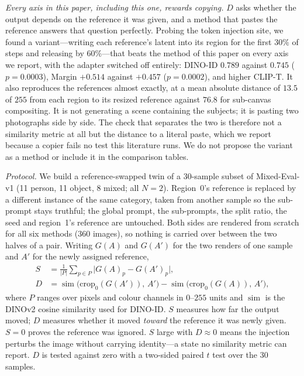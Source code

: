 \documentclass[review,10pt,times]{elsarticle}
\begin{document}
\noindent\textit{Every axis in this paper, including this one, rewards
copying.}
$D$ asks whether the output depends on the reference it was given, and a
method that pastes the reference answers that question perfectly.  Probing
the token injection site, we found a variant---writing each reference's
latent into its region for the first $30\%$ of steps and releasing by
$60\%$---that beats the method of this paper on every axis we report, with
the adapter switched off entirely: DINO-ID $0.789$ against $0.745$
($p{=}0.0003$), Margin $+0.514$ against $+0.457$ ($p{=}0.0002$), and higher
CLIP-T.  It also reproduces the references almost exactly, at a mean absolute
distance of $13.5$ of $255$ from each region to its resized reference against
$76.8$ for sub-canvas compositing.  It is not generating a scene containing
the subjects; it is pasting two photographs side by side.  The check that
separates the two is therefore not a similarity metric at all but the
distance to a literal paste, which we report because a copier fails no test
this literature runs.  We do not propose the variant as a method or include
it in the comparison tables.

\noindent\textit{Protocol.}
We build a reference-swapped twin of a 30-sample subset of Mixed-Eval-v1
(11 person, 11 object, 8 mixed; all $N{=}2$).  Region~0's reference is
replaced by a different instance of the same category, taken from another
sample so the sub-prompt stays truthful; the global prompt, the sub-prompts,
the split ratio, the seed and region~1's reference are untouched.  Both sides
are rendered from scratch for all six methods (360 images), so nothing is
carried over between the two halves of a pair.  Writing $G(A)$ and $G(A')$
for the two renders of one sample and $A'$ for the newly assigned reference,
\begin{align}
  S &= \tfrac{1}{|P|}\textstyle\sum_{p\in P}
       \bigl|G(A)_p - G(A')_p\bigr|, \label{eq:swapS}\\
  D &= \operatorname{sim}\!\bigl(\mathrm{crop}_0(G(A')),\,A'\bigr)
     - \operatorname{sim}\!\bigl(\mathrm{crop}_0(G(A)),\,A'\bigr),
       \label{eq:swapD}
\end{align}
where $P$ ranges over pixels and colour channels in $0$--$255$ units and
$\operatorname{sim}$ is the DINOv2 cosine similarity used for DINO-ID.
$S$ measures how far the output moved; $D$ measures whether it moved
\emph{toward} the reference it was newly given.  $S{=}0$ proves the reference
was ignored.  $S$ large with $D{\approx}0$ means the injection perturbs the
image without carrying identity---a state no similarity metric can report.
$D$ is tested against zero with a two-sided paired $t$ test over the 30
samples.
\end{document}
